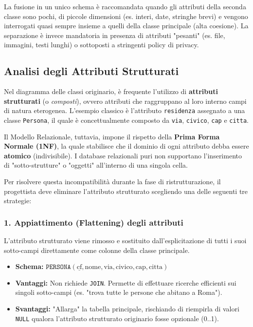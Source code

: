 \begin{tip}
La fusione in un unico schema è raccomandata quando gli attributi della seconda classe sono pochi, di piccole dimensioni (es. interi, date, stringhe brevi) e vengono interrogati quasi sempre insieme a quelli della classe principale (alta coesione). La separazione è invece mandatoria in presenza di attributi "pesanti" (es. file, immagini, testi lunghi) o sottoposti a stringenti policy di privacy.
\end{tip}

\subsection{Analisi degli Attributi Strutturati}

Nel diagramma delle classi originario, è frequente l'utilizzo di \textbf{attributi strutturati} (o \textit{composti}), ovvero attributi che raggruppano al loro interno campi di natura eterogenea. L'esempio classico è l'attributo \texttt{residenza} assegnato a una classe \texttt{Persona}, il quale è concettualmente composto da \texttt{via}, \texttt{civico}, \texttt{cap} e \texttt{citta}.

Il Modello Relazionale, tuttavia, impone il rispetto della \textbf{Prima Forma Normale (1NF)}, la quale stabilisce che il dominio di ogni attributo debba essere \textbf{atomico} (indivisibile). I database relazionali puri non supportano l'inserimento di "sotto-strutture" o "oggetti" all'interno di una singola cella. 

Per risolvere questa incompatibilità durante la fase di ristrutturazione, il progettista deve eliminare l'attributo strutturato scegliendo una delle seguenti tre strategie:

\subsubsection*{1. Appiattimento (Flattening) degli attributi}
L'attributo strutturato viene rimosso e sostituito dall'esplicitazione di tutti i suoi sotto-campi direttamente come colonne della classe principale.
\begin{itemize}
    \item \textbf{Schema:} $\texttt{PERSONA}(\underline{\text{cf}}, \text{nome}, \text{via}, \text{civico}, \text{cap}, \text{citta})$
    \item \textbf{Vantaggi:} Non richiede \texttt{JOIN}. Permette di effettuare ricerche efficienti sui singoli sotto-campi (es. "trova tutte le persone che abitano a Roma").
    \item \textbf{Svantaggi:} "Allarga" la tabella principale, rischiando di riempirla di valori \texttt{NULL} qualora l'attributo strutturato originario fosse opzionale (0..1).
\end{itemize}

